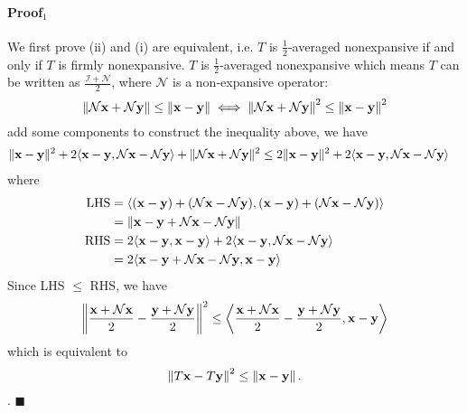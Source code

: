 \documentclass[11pt]{article}
\def\ny{\mathcal N \bold y}
\def\nx{\mathcal N \bold x}
\def\bx{\bold x}
\def\by{\bold y}
\def\tx{T \bold x}
\def\ty{T \bold y}
\newcommand\norm[1]{\left\lVert#1\right\rVert}
\newcommand\vc[1]{\left\langle{#1}\right\rangle }
\newcommand*{\QEDA}{\hfill\ensuremath{\blacksquare}}
\begin{document}
\paragraph{Proof$_1$} We first prove (ii) and (i) are equivalent, i.e.  $T$ is $\frac{1}{2}$-averaged nonexpansive if and only if $T$ is firmly nonexpansive. $T$ is $\frac{1}{2}$-averaged nonexpansive which means $T$ can be written as $\frac{\mathcal I + \mathcal N}{2}$, where $\mathcal N$ is a non-expansive operator:
$$
\norm{ \mathcal N \bold x + \mathcal N \bold y }  \leq \norm{ \bold x - \bold y } \iff \norm{ \mathcal N \bold x + \mathcal N \bold y } ^2 \leq \norm {\bold x - \bold y }^2
$$
add some components to construct the inequality above, we have
$$
\begin{aligned}
	\| \bold x - \bold y \|^2 + 2 \langle \bold x - \bold y, \mathcal N \bold x - \mathcal N \bold y \rangle +  \| \mathcal N \bold x + \mathcal N \bold y \| ^2 
&\leq
2  \| \bold x - \bold y \|^2 + 2 \langle \bold x - \bold y, \mathcal N \bold x - \mathcal N \bold y \rangle
\end{aligned}
$$
where
$$
\begin{aligned}
	\text{LHS} &= \langle (\bold x - \bold y) + (\mathcal N \bold x - \mathcal N \bold y), (\bold x - \bold y) + (\mathcal N \bold x - \mathcal N \bold y) \rangle \\
	&= \norm{ \bx - \by + \nx - \ny} \\
	\text{RHS}&= 2 \langle \bold x - \bold y, \bold x - \bold y\rangle  + 2 \langle \bold x - \bold y , \nx  - \mathcal N \bold y\rangle \\
	&= 2 \langle \bx - \by  + \nx - \ny ,\bx - \by \rangle
\end{aligned}
$$
Since LHS $\leq$ RHS, we have 
$$
\norm{\frac {\bx + \nx}{2} - \frac{\by + \ny}{2}} ^ 2 \leq \vc{\frac{\bx + \nx}{2} - \frac{\by + \ny}{2},\bx - \by}
$$
which is equivalent to 
$$
\norm{\tx - \ty }^2 \leq \norm{\bx - \by}.
$$.
 \QEDA
\end{document}
